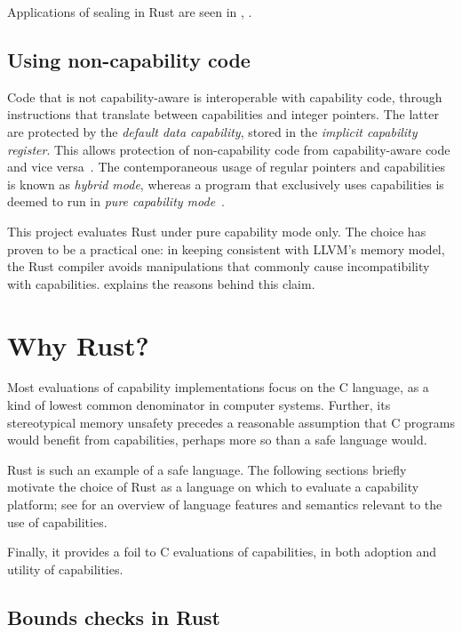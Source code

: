 \documentclass[dissertation.tex]{subfiles}
\begin{document}
Applications of sealing in Rust are seen in
, .


\subsection{Using non-capability code}
Code that is not capability-aware is interoperable with capability code,
through instructions that translate between capabilities and integer
pointers.
The latter are protected by the \emph{default data capability}, stored
in the \emph{implicit capability register}.
This allows protection of non-capability code from capability-aware code
and vice versa~\cite{cheri-risc-2014}.
The contemporaneous usage of regular pointers and capabilities is known
as \emph{hybrid mode}, whereas a program that exclusively uses
capabilities is deemed to run in \emph{pure capability
mode}~\cite{cheri-prog-guide}.

This project evaluates Rust under pure capability mode only.
The choice has proven to be a practical one: in keeping consistent with
LLVM's memory model, the Rust compiler avoids manipulations that
commonly cause incompatibility with capabilities.
 explains the reasons behind this claim.


\section{Why Rust?}
\label{sec:bg-why-rust}

Most evaluations of capability implementations focus on the C language,
as a kind of lowest common denominator in computer systems.
Further, its stereotypical memory unsafety precedes a reasonable
assumption that C programs would benefit from capabilities, perhaps more
so than a safe language would.

Rust is such an example of a safe language.
The following sections briefly motivate the choice of Rust as a language
on which to evaluate a capability platform;
see  for an overview of language features and semantics
relevant to the use of capabilities.

Finally, it provides a foil to C evaluations of capabilities, in both
adoption and utility of capabilities.


\subsection{Bounds checks in Rust}
\label{sec:bg-rust-bounds}
\end{document}
